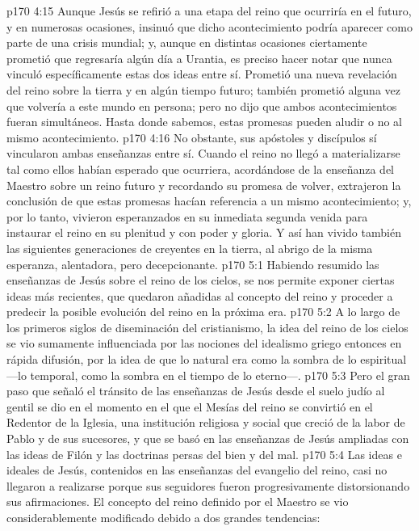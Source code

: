 \vs p170 4:15 Aunque Jesús se refirió a una etapa del reino que ocurriría en el futuro, y en numerosas ocasiones, insinuó que dicho acontecimiento podría aparecer como parte de una crisis mundial; y, aunque en distintas ocasiones ciertamente prometió que regresaría algún día a Urantia, es preciso hacer notar que nunca vinculó específicamente estas dos ideas entre sí. Prometió una nueva revelación del reino sobre la tierra y en algún tiempo futuro; también prometió alguna vez que volvería a este mundo en persona; pero no dijo que ambos acontecimientos fueran simultáneos. Hasta donde sabemos, estas promesas pueden aludir o no al mismo acontecimiento.
\vs p170 4:16 No obstante, sus apóstoles y discípulos sí vincularon ambas enseñanzas entre sí. Cuando el reino no llegó a materializarse tal como ellos habían esperado que ocurriera, acordándose de la enseñanza del Maestro sobre un reino futuro y recordando su promesa de volver, extrajeron la conclusión de que estas promesas hacían referencia a un mismo acontecimiento; y, por lo tanto, vivieron esperanzados en su inmediata segunda venida para instaurar el reino en su plenitud y con poder y gloria. Y así han vivido también las siguientes generaciones de creyentes en la tierra, al abrigo de la misma esperanza, alentadora, pero decepcionante.
\vs p170 5:1 Habiendo resumido las enseñanzas de Jesús sobre el reino de los cielos, se nos permite exponer ciertas ideas más recientes, que quedaron añadidas al concepto del reino y proceder a predecir la posible evolución del reino en la próxima era.
\vs p170 5:2 A lo largo de los primeros siglos de diseminación del cristianismo, la idea del reino de los cielos se vio sumamente influenciada por las nociones del idealismo griego entonces en rápida difusión, por la idea de que lo natural era como la sombra de lo espiritual ---lo temporal, como la sombra en el tiempo de lo eterno---.
\vs p170 5:3 Pero el gran paso que señaló el tránsito de las enseñanzas de Jesús desde el suelo judío al gentil se dio en el momento en el que el Mesías del reino se convirtió en el Redentor de la Iglesia, una institución religiosa y social que creció de la labor de Pablo y de sus sucesores, y que se basó en las enseñanzas de Jesús ampliadas con las ideas de Filón y las doctrinas persas del bien y del mal.
\vs p170 5:4 Las ideas e ideales de Jesús, contenidos en las enseñanzas del evangelio del reino, casi no llegaron a realizarse porque sus seguidores fueron progresivamente distorsionando sus afirmaciones. El concepto del reino definido por el Maestro se vio considerablemente modificado debido a dos grandes tendencias:
